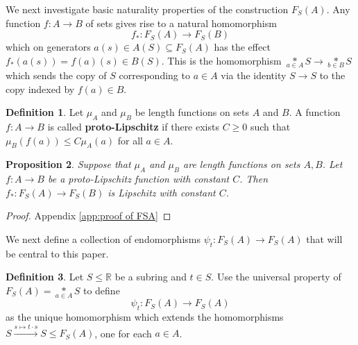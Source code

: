 \documentclass[12pt]{amsart}
\newtheorem{prop}{Proposition}[section]
\theoremstyle{definition}
\newtheorem{defn}[prop]{Definition}
\def\RR{\ensuremath{\mathbb{R}}}
\newcommand{\xto}[1]{\xrightarrow{#1}}
\def\Free{F}
\begin{document}


We next investigate basic naturality properties of the construction $\Free_S(A)$.
Any function $f \colon A \to B$ of sets gives rise to a natural homomorphism 
\[
f_* \colon \Free_S(A) \to \Free_S(B)
\]
which on generators $a(s) \in A(S) \subseteq \Free_S(A)$ has the effect $f_*(a(s))=f(a)(s) \in B(S)$.
This is the homomorphism $\underset{a \in A}{*} S \to \underset{b \in B}{*} S$ which sends the copy of $S$ corresponding to $a \in A$ via the identity $S \to S$ to the copy indexed by $f(a) \in B$.




\begin{defn}\label{D:proto-Lipschitz}
Let $\mu_A$ and $\mu_B$ be length functions on sets $A$ and $B$.
A function $f \colon A \to B$ is called {\bf proto-Lipschitz} if there exists $C \geq 0$ such that $\mu_B (f(a)) \leq C \mu_A(a)$ for all $a \in A$.
\end{defn}






\begin{prop}\label{P:naturality FRA} 
Suppose that $\mu_A$ and $\mu_B$ are length functions on sets $A,B$.
Let $f \colon A \to B$ be a proto-Lipschitz function with constant $C$. %
Then $f_*\colon \Free_S(A) \to \Free_S(B)$ is Lipschitz with constant $C$.
\end{prop}


\begin{proof}
Appendix \ref{app:proof of FSA}
\end{proof}









We next define a collection of endomorphisms $\psi_t \colon \Free_S(A) \to \Free_S(A)$ that will be central to this paper.


\begin{defn}\label{defn:psit in S}
Let $S \leq \RR$ be a subring and $t \in S$.
Use the universal property of $\Free_S(A)=\underset{a \in A}{*} S$ to define
\[
\psi_t \colon \Free_S(A) \to \Free_S(A)
\]
as the unique homomorphism %
which extends the homomorphisms $S \xto {s \mapsto t \cdot s} S \leq \Free_S(A)$, one for each $a \in A$.
\end{defn}
\end{document}
